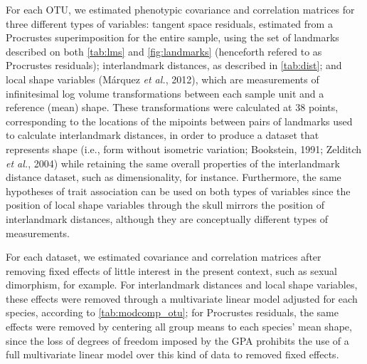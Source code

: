 \documentclass[12pt,]{article}
\begin{document}
For each OTU, we estimated phenotypic covariance and correlation
matrices for three different types of variables: tangent space
residuals, estimated from a Procrustes superimposition for the entire
sample, using the set of landmarks described on both \autoref{tab:lms}
and \autoref{fig:landmarks} (henceforth refered to as Procrustes
residuals); interlandmark distances, as described in \autoref{tab:dist};
and local shape variables (Márquez \emph{et al.}, 2012), which are
measurements of infinitesimal log volume transformations between each
sample unit and a reference (mean) shape. These transformations were
calculated at 38 points, corresponding to the locations of the mipoints
between pairs of landmarks used to calculate interlandmark distances, in
order to produce a dataset that represents shape (i.e., form without
isometric variation; Bookstein, 1991; Zelditch \emph{et al.}, 2004)
while retaining the same overall properties of the interlandmark
distance dataset, such as dimensionality, for instance. Furthermore, the
same hypotheses of trait association can be used on both types of
variables since the position of local shape variables through the skull
mirrors the position of interlandmark distances, although they are
conceptually different types of measurements.

For each dataset, we estimated covariance and correlation matrices after
removing fixed effects of little interest in the present context, such
as sexual dimorphism, for example. For interlandmark distances and local
shape variables, these effects were removed through a multivariate
linear model adjusted for each species, according to
\autoref{tab:modcomp_otu}; for Procrustes residuals, the same effects
were removed by centering all group means to each species' mean shape,
since the loss of degrees of freedom imposed by the GPA prohibits the
use of a full multivariate linear model over this kind of data to
removed fixed effects.
\end{document}

